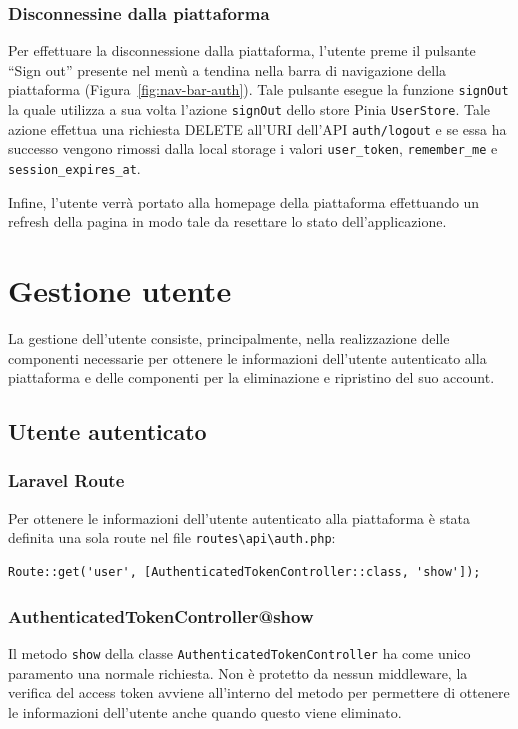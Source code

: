 \subsubsection{Disconnessine dalla piattaforma}
Per effettuare la disconnessione dalla piattaforma, l'utente preme il pulsante ``Sign out'' presente nel men\`u a tendina nella barra di navigazione della piattaforma (Figura~\ref{fig:nav-bar-auth}). Tale pulsante esegue la funzione \verb|signOut| la quale utilizza a sua volta l'azione \verb|signOut| dello store Pinia \verb|UserStore|. Tale azione effettua una richiesta DELETE all'URI dell'API \verb|auth/logout| e se essa ha successo vengono rimossi dalla local storage i valori \verb|user_token|,  \verb|remember_me| e \verb|session_expires_at|.

Infine, l'utente verr\`a portato alla homepage della piattaforma effettuando un refresh della pagina in modo tale da resettare lo stato dell'applicazione.

\section{Gestione utente}
La gestione dell'utente consiste, principalmente, nella realizzazione delle componenti necessarie per ottenere le informazioni dell'utente autenticato alla piattaforma e delle componenti per la eliminazione e ripristino del suo account.

\subsection{Utente autenticato}
\subsubsection{Laravel Route}
Per ottenere le informazioni dell'utente autenticato alla piattaforma \`e stata definita una sola route nel file \verb|routes\api\auth.php|:
\begin{lstlisting}[caption={Route per ottenere l'utente autenticato}, label={lst:route_logout}]
Route::get('user', [AuthenticatedTokenController::class, 'show']);
\end{lstlisting}

\subsubsection{AuthenticatedTokenController@show}
Il metodo \verb|show| della classe \verb|AuthenticatedTokenController| ha come unico paramento una normale richiesta. Non \`e protetto da nessun middleware, la verifica del access token avviene all'interno del metodo per permettere di ottenere le informazioni dell'utente anche quando questo viene eliminato.

